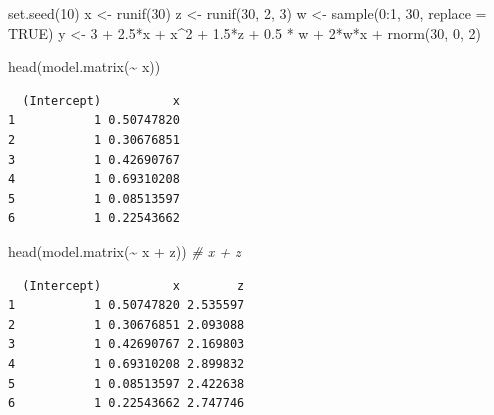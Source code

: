 \documentclass[
  11pt,
]{krantz}
\newenvironment{Shaded}{\begin{snugshade}}{\end{snugshade}}
\newcommand{\AttributeTok}[1]{\textcolor[rgb]{0.61,0.61,0.61}{#1}}
\newcommand{\CommentTok}[1]{\textcolor[rgb]{0.37,0.37,0.37}{\textit{#1}}}
\newcommand{\ConstantTok}[1]{\textcolor[rgb]{0,0,0}{#1}}
\newcommand{\DecValTok}[1]{\textcolor[rgb]{0.06,0.06,0.06}{#1}}
\newcommand{\FloatTok}[1]{\textcolor[rgb]{0.06,0.06,0.06}{#1}}
\newcommand{\FunctionTok}[1]{\textcolor[rgb]{0,0,0}{#1}}
\newcommand{\NormalTok}[1]{#1}
\newcommand{\OtherTok}[1]{\textcolor[rgb]{0.37,0.37,0.37}{#1}}
\newcommand{\SpecialCharTok}[1]{\textcolor[rgb]{0,0,0}{#1}}
\begin{document}
\normalsize

\footnotesize

\begin{Shaded}
\begin{Highlighting}[]
\FunctionTok{set.seed}\NormalTok{(}\DecValTok{10}\NormalTok{)}
\NormalTok{x }\OtherTok{\textless{}{-}} \FunctionTok{runif}\NormalTok{(}\DecValTok{30}\NormalTok{)}
\NormalTok{z }\OtherTok{\textless{}{-}} \FunctionTok{runif}\NormalTok{(}\DecValTok{30}\NormalTok{, }\DecValTok{2}\NormalTok{, }\DecValTok{3}\NormalTok{)}
\NormalTok{w }\OtherTok{\textless{}{-}} \FunctionTok{sample}\NormalTok{(}\DecValTok{0}\SpecialCharTok{:}\DecValTok{1}\NormalTok{, }\DecValTok{30}\NormalTok{, }\AttributeTok{replace =} \ConstantTok{TRUE}\NormalTok{)}
\NormalTok{y }\OtherTok{\textless{}{-}} \DecValTok{3} \SpecialCharTok{+} \FloatTok{2.5}\SpecialCharTok{*}\NormalTok{x }\SpecialCharTok{+}\NormalTok{ x}\SpecialCharTok{\^{}}\DecValTok{2} \SpecialCharTok{+} \FloatTok{1.5}\SpecialCharTok{*}\NormalTok{z }\SpecialCharTok{+} \FloatTok{0.5} \SpecialCharTok{*}\NormalTok{ w }\SpecialCharTok{+} \DecValTok{2}\SpecialCharTok{*}\NormalTok{w}\SpecialCharTok{*}\NormalTok{x }\SpecialCharTok{+} \FunctionTok{rnorm}\NormalTok{(}\DecValTok{30}\NormalTok{, }\DecValTok{0}\NormalTok{, }\DecValTok{2}\NormalTok{)}

\FunctionTok{head}\NormalTok{(}\FunctionTok{model.matrix}\NormalTok{(}\SpecialCharTok{\textasciitilde{}}\NormalTok{ x))}
\end{Highlighting}
\end{Shaded}

\begin{verbatim}
  (Intercept)          x
1           1 0.50747820
2           1 0.30676851
3           1 0.42690767
4           1 0.69310208
5           1 0.08513597
6           1 0.22543662
\end{verbatim}

\begin{Shaded}
\begin{Highlighting}[]
\FunctionTok{head}\NormalTok{(}\FunctionTok{model.matrix}\NormalTok{(}\SpecialCharTok{\textasciitilde{}}\NormalTok{ x }\SpecialCharTok{+}\NormalTok{ z)) }\CommentTok{\# x + z}
\end{Highlighting}
\end{Shaded}

\begin{verbatim}
  (Intercept)          x        z
1           1 0.50747820 2.535597
2           1 0.30676851 2.093088
3           1 0.42690767 2.169803
4           1 0.69310208 2.899832
5           1 0.08513597 2.422638
6           1 0.22543662 2.747746
\end{verbatim}
\end{document}
